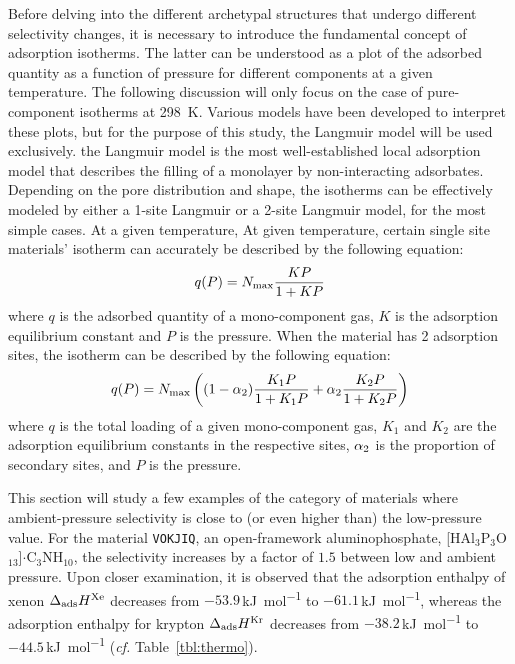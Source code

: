 \documentclass[main.tex]{subfiles}
\begin{document}
Before delving into the different archetypal structures that undergo different selectivity changes, it is necessary to introduce the fundamental concept of adsorption isotherms. The latter can be understood as a plot of the adsorbed quantity as a function of pressure for different components at a given temperature. The following discussion will only focus on the case of pure-component isotherms at \SI{298}{\kelvin}. Various models have been developed to interpret these plots,\autocite{Al_Ghouti_2020} but for the purpose of this study, the Langmuir model will be used exclusively. the Langmuir model is the most well-established local adsorption model that describes the filling of a monolayer by non-interacting adsorbates. Depending on the pore distribution and shape, the isotherms can be effectively modeled by either a 1-site Langmuir or a 2-site Langmuir model, for the most simple cases. At a given temperature, At given temperature, certain single site materials' isotherm can accurately be described by the following equation:
\begin{equation}\label{eq:langmuir_1}
    q(P) = N_{\text{max}}\dfrac{KP}{1+KP}
\end{equation}
where $q$ is the adsorbed quantity of a mono-component gas, $K$ is the adsorption equilibrium constant and $P$ is the pressure. When the material has 2 adsorption sites, the isotherm can be described by the following equation:
\begin{equation}\label{eq:langmuir_2}
    q(P) = N_{\text{max}}\left((1-\alpha_{\text{2}})\dfrac{K_{\text{1}}P}{1+K_{\text{1}}P}+\alpha_{\text{2}}\dfrac{K_{\text{2}}P}{1+K_{\text{2}}P}\right)
\end{equation}
where $q$ is the total loading of a given mono-component gas, $K_1$ and $K_2$ are the adsorption equilibrium constants in the respective sites, $\alpha_{\text{2}}$ is the proportion of secondary sites, and $P$ is the pressure.
  
This section will study a few examples of the category of materials where ambient-pressure selectivity is close to (or even higher than) the low-pressure value. For the material \texttt{VOKJIQ},\autocite{VOKJIQ} an open-framework aluminophosphate, [HAl$_3$P$_3$O$_{13}$]$\cdot$C$_3$NH$_{10}$, the selectivity increases by a factor of $1.5$ between low and ambient pressure. Upon closer examination, it is observed that the adsorption enthalpy of xenon $\Delta_{\text{ads}}H^{\text{Xe}}$ decreases from $-53.9$\,\si{\kilo\joule\per\mol} to $-61.1$\,\si{\kilo\joule\per\mol}, whereas the adsorption enthalpy for krypton $\Delta_{\text{ads}}H^{\text{Kr}}$ decreases from $-38.2$\,\si{\kilo\joule\per\mol} to $-44.5$\,\si{\kilo\joule\per\mol} (\emph{cf.} Table~\ref{tbl:thermo}). 
\end{document}
